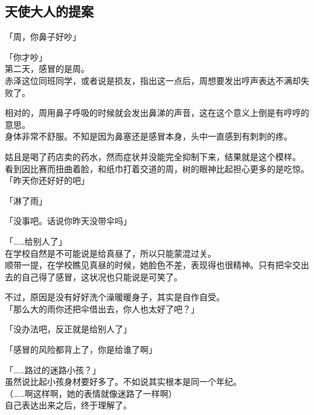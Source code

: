 \subsection{天使大人的提案}

「周，你鼻子好吵」

「你才吵」\\

第二天，感冒的是周。\\

赤泽这位同班同学，或者说是损友，指出这一点后，周想要发出哼声表达不满却失败了。

相对的，周用鼻子呼吸的时候就会发出鼻涕的声音，这在这个意义上倒是有哼哼的意思。\\

身体非常不舒服。不知是因为鼻塞还是感冒本身，头中一直感到有刺刺的疼。

姑且是喝了药店卖的药水，然而症状并没能完全抑制下来，结果就是这个模样。\\

看到因比赛而扭曲着脸，和纸巾打着交道的周，树的眼神比起担心更多的是吃惊。\\

「昨天你还好好的吧」

「淋了雨」

「没事吧。话说你昨天没带伞吗」

「……给别人了」\\

在学校自然是不可能说是给真昼了，所以只能蒙混过关。\\

顺带一提，在学校瞧见真昼的时候，她脸色不差，表现得也很精神。只有把伞交出去的自己得了感冒，这状况也只能说是可笑了。

不过，原因是没有好好洗个澡暖暖身子，其实是自作自受。\\

「那么大的雨你还把伞借出去，你人也太好了吧？」

「没办法吧，反正就是给别人了」

「感冒的风险都背上了，你是给谁了啊」

「……路过的迷路小孩？」\\

虽然说比起小孩身材要好多了。不如说其实根本是同一个年纪。\\

（……啊这样啊，她的表情就像迷路了一样啊）\\

自己表达出来之后，终于理解了。

